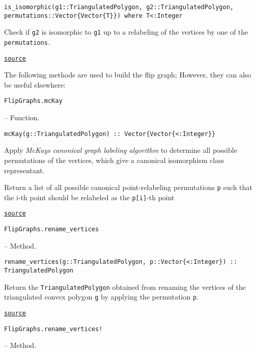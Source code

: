 \begin{adjustwidth}{2em}{0pt}


\begin{verbatim}
is_isomorphic(g1::TriangulatedPolygon, g2::TriangulatedPolygon, permutations::Vector{Vector{T}}) where T<:Integer
\end{verbatim}

Check if \texttt{g2} is isomorphic to \texttt{g1} up to a relabeling of the vertices by one of the \texttt{permutations}.



\href{https://github.com/schto223/FlipGraphs.jl/blob/e35d43698a06b86273148826b79d585ba04fcd26/src/flipGraphPlanar.jl#L343-L347}{\texttt{source}}


\end{adjustwidth}

The following methods are used to build the flip graph; However, they can also be useful elsewhere:


\hypertarget{1425231861830903434}{\texttt{FlipGraphs.mcKay}}  -- {Function.}

\begin{adjustwidth}{2em}{0pt}


\begin{verbatim}
mcKay(g::TriangulatedPolygon) :: Vector{Vector{<:Integer}}
\end{verbatim}

Apply \emph{McKay{\textquotesingle}s canonical graph labeling algorithm} to determine all possible permutations  of the vertices, which give a canonical isomorphism class representant.

Return a list of all possible canonical point-relabeling permutations \texttt{p} such that the i-th point should be relabeled as the \texttt{p[i]}-th point



\href{https://github.com/schto223/FlipGraphs.jl/blob/e35d43698a06b86273148826b79d585ba04fcd26/src/flipGraphPlanar.jl#L405-L412}{\texttt{source}}


\end{adjustwidth}
\hypertarget{18413919120035264143}{\texttt{FlipGraphs.rename\_vertices}}  -- {Method.}

\begin{adjustwidth}{2em}{0pt}


\begin{verbatim}
rename_vertices(g::TriangulatedPolygon, p::Vector{<:Integer}) :: TriangulatedPolygon
\end{verbatim}

Return the \texttt{TriangulatedPolygon} obtained from renaming the vertices of the triangulated convex polygon \texttt{g} by applying the permutation \texttt{p}.



\href{https://github.com/schto223/FlipGraphs.jl/blob/e35d43698a06b86273148826b79d585ba04fcd26/src/flipGraphPlanar.jl#L317-L321}{\texttt{source}}


\end{adjustwidth}
\hypertarget{16314066137346966911}{\texttt{FlipGraphs.rename\_vertices!}}  -- {Method.}

